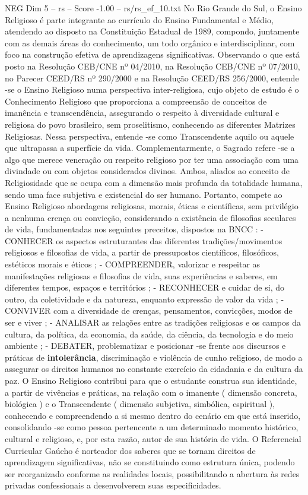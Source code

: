 \begin{textsample}{NEG Dim 5 – rs – Score -1.00 – rs/rs\_ef\_10.txt}
No Rio Grande do Sul, o Ensino Religioso é parte integrante ao currículo do Ensino Fundamental e Médio, atendendo ao disposto na Constituição Estadual de 1989, compondo, juntamente com as demais áreas do conhecimento, um todo orgânico e interdisciplinar, com foco na construção efetiva de aprendizagens significativas.
Observando o que está posto na Resolução CEB/CNE nº 04/2010, na Resolução CEB/CNE nº 07/2010, no Parecer CEED/RS nº 290/2000 e na Resolução CEED/RS 256/2000, entende -se o Ensino Religioso numa perspectiva inter-religiosa, cujo objeto de estudo é o Conhecimento Religioso que proporciona a compreensão de conceitos de imanência e transcendência, assegurando o respeito à diversidade cultural e religiosa do povo brasileiro, sem proselitismo, conhecendo as diferentes Matrizes Religiosas.
Nessa perspectiva, entende -se como Transcendente aquilo ou aquele que ultrapassa a superfície da vida.
Complementarmente, o Sagrado refere -se a algo que merece veneração ou respeito religioso por ter uma associação com uma divindade ou com objetos considerados divinos.
Ambos, aliados ao conceito de Religiosidade que se ocupa com a dimensão mais profunda da totalidade humana, sendo uma face subjetiva e existencial do ser humano.
Portanto, compete ao Ensino Religioso abordagens religiosas, morais, éticas e científicas, sem privilégio a nenhuma crença ou convicção, considerando a existência de filosofias seculares de vida, fundamentadas nos seguintes preceitos, dispostos na BNCC : - CONHECER os aspectos estruturantes das diferentes tradições/movimentos religiosos e filosofias de vida, a partir de pressupostos científicos, filosóficos, estéticos morais e éticos ; - COMPREENDER, valorizar e respeitar as manifestações religiosas e filosofias de vida, suas experiências e saberes, em diferentes tempos, espaços e territórios ; - RECONHECER e cuidar de si, do outro, da coletividade e da natureza, enquanto expressão de valor da vida ; - CONVIVER com a diversidade de crenças, pensamentos, convicções, modos de ser e viver ; - ANALISAR as relações entre as tradições religiosas e os campos da cultura, da política, da economia, da saúde, da ciência, da tecnologia e do meio ambiente ; - DEBATER, problematizar e posicionar -se frente aos discursos e práticas de \textbf{intolerância}, discriminação e violência de cunho religioso, de modo a assegurar os direitos humanos no constante exercício da cidadania e da cultura da paz.
O Ensino Religioso contribui para que o estudante construa sua identidade, a partir de vivências e práticas, na relação com o imanente ( dimensão concreta, biológica ) e o Transcendente ( dimensão subjetiva, simbólica, espiritual ), conhecendo e compreendendo a si mesmo dentro do cenário em que está inserido, consolidando -se como pessoa pertencente a um determinado momento histórico, cultural e religioso, e, por esta razão, autor de sua história de vida.
O Referencial Curricular Gaúcho é norteador dos saberes que se tornam direitos de aprendizagem significativas, não se constituindo como estrutura única, podendo ser reorganizado conforme as realidades locais, possibilitando a abertura às redes privadas confessionais a desenvolverem suas especificidades.

\end{textsample}
